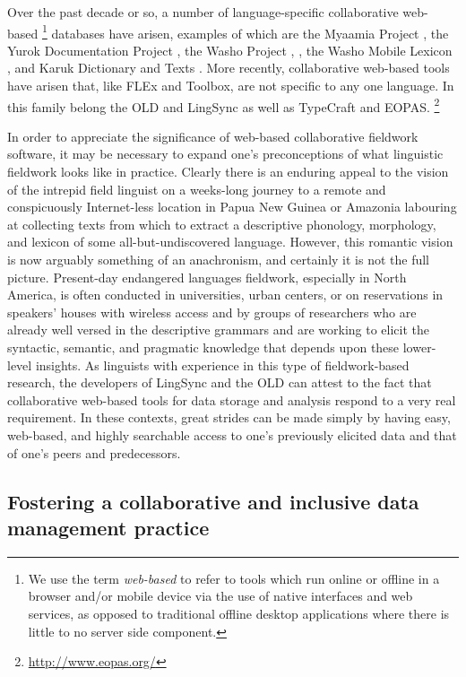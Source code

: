 \documentclass[11pt]{article}
\begin{document}
Over the past decade or so, a number of language-specific collaborative web-based%
\footnote{We use the term \emph{web-based} to refer to tools which run online
or offline in a browser and/or mobile device via the use of native interfaces
and web services, as opposed to traditional offline desktop applications where
there is little to no server side component.} %
databases have arisen, examples of which are the Myaamia Project
\cite{Myaamia:2001}, the Yurok Documentation Project \cite{Yurok:2001:Online},
the Washo Project \cite{Washo:2005:Online}, \cite{Cihlar:2008}, the Washo
Mobile Lexicon \cite{WashoMobile:2008:Online}, and Karuk Dictionary and Texts
\cite{Karuk:2009:Online}. More recently, collaborative web-based
tools have arisen that, like FLEx and Toolbox, are not specific to any one language.
In this family belong the OLD \cite{dunham2014} and LingSync \cite{lingsync:2012}
as well as TypeCraft \cite{farrar10} and EOPAS.%
\footnote{\url{http://www.eopas.org/}} %

In order to appreciate the significance of web-based collaborative fieldwork
software, it may be necessary to expand one's preconceptions of what linguistic
fieldwork looks like in practice. Clearly there is an enduring appeal
to the vision of the intrepid field linguist on a weeks-long journey to a
remote and conspicuously Internet-less location in Papua New Guinea or Amazonia
labouring at collecting texts from which to extract a descriptive phonology,
morphology, and lexicon of some all-but-undiscovered language. However, this
romantic vision is now arguably something of an anachronism, and certainly it
is not the full picture. Present-day endangered languages fieldwork, especially
in North America, is often conducted in universities, urban centers, or on
reservations in speakers' houses with wireless access and by groups of
researchers who are already well versed in the descriptive grammars and are
working to elicit the syntactic, semantic, and pragmatic knowledge that depends
upon these lower-level insights. As linguists with experience in this type of
fieldwork-based research, the developers of LingSync and the OLD can attest to
the fact that collaborative web-based tools for data storage and analysis respond
to a very real requirement. In these contexts, great strides can be made simply
by having easy, web-based, and highly searchable access to one's previously
elicited data and that of one's peers and predecessors.


\subsection{Fostering a collaborative and inclusive data management practice}
\end{document}
